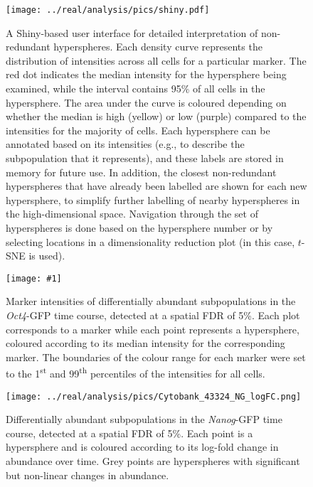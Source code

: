 \documentclass{article}
\begin{document}
\begin{figure}[tbp]
    \begin{center}
        \texttt{[image: ../real/analysis/pics/shiny.pdf]}
    \end{center}
    \caption{A Shiny-based user interface for detailed interpretation of non-redundant hyperspheres.
            Each density curve represents the distribution of intensities across all cells for a particular marker.
            The red dot indicates the median intensity for the hypersphere being examined, while the interval contains 95\% of all cells in the hypersphere.
            The area under the curve is coloured depending on whether the median is high (yellow) or low (purple) compared to the intensities for the majority of cells.
            Each hypersphere can be annotated based on its intensities (e.g., to describe the subpopulation that it represents), and these labels are stored in memory for future use.
            In addition, the closest non-redundant hyperspheres that have already been labelled are shown for each new hypersphere, to simplify further labelling of nearby hyperspheres in the high-dimensional space.
            Navigation through the set of hyperspheres is done based on the hypersphere number or by selecting locations in a dimensionality reduction plot (in this case, $t$-SNE is used).
}
\label{fig:shiny}
\end{figure}

\clearpage
\newcommand{\bigfigopt}[1]{\texttt{[image: \#1]}}

\begin{figure}[p]
    \begin{center}
    \bigfigopt{../real/analysis/pics/Cytobank_43324_4FI_markers.png}
    \end{center}
    \caption{
        Marker intensities of differentially abundant subpopulations in the \textit{Oct4}-GFP time course, detected at a spatial FDR of 5\%.
        Each plot corresponds to a marker while each point represents a hypersphere, coloured according to its median intensity for the corresponding marker.
        The boundaries of the colour range for each marker were set to the 1\textsuperscript{st} and 99\textsuperscript{th} percentiles of the intensities for all cells.
    }
    \label{fig:oct4_markers}
\end{figure}

\begin{figure}[p]
    \begin{center}
    \texttt{[image: ../real/analysis/pics/Cytobank\_43324\_NG\_logFC.png]}
    \end{center}
    \caption{
        Differentially abundant subpopulations in the \textit{Nanog}-GFP time course, detected at a spatial FDR of 5\%.
        Each point is a hypersphere and is coloured according to its log-fold change in abundance over time.
        Grey points are hyperspheres with significant but non-linear changes in abundance.
    }
\end{figure}
\end{document}
